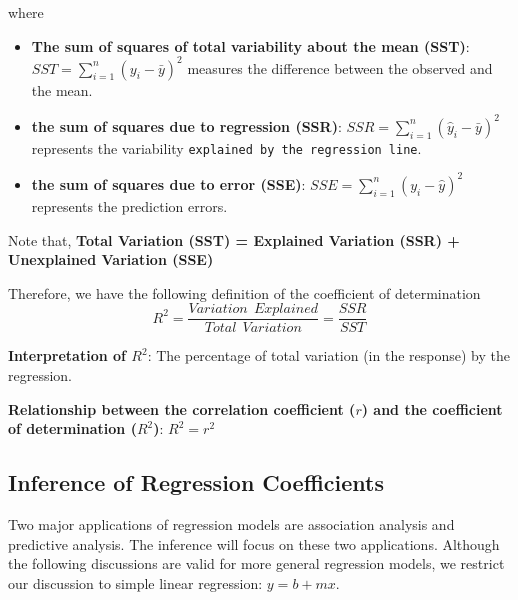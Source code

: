 \documentclass[
]{book}
\providecommand{\tightlist}{%
  \setlength{\itemsep}{0pt}\setlength{\parskip}{0pt}}
\begin{document}
where

\begin{itemize}
\tightlist
\item
  \textbf{The sum of squares of total variability about the mean (SST)}: \(SST = \sum_{i=1}^n(y_i-\bar{y})^2\) measures the difference between the observed and the mean.
\item
  \textbf{the sum of squares due to regression (SSR)}: \(SSR = \sum_{i=1}^n(\hat{y}_i-\bar{y})^2\) represents the variability \texttt{explained\ by\ the\ regression\ line}.
\item
  \textbf{the sum of squares due to error (SSE)}: \(SSE = \sum_{i=1}^n(y_i-\hat{y})^2\) represents the prediction errors.
\end{itemize}

Note that, \textbf{Total Variation (SST) = Explained Variation (SSR) + Unexplained Variation (SSE)}

Therefore, we have the following definition of the coefficient of determination
\[
R^2 = \frac{Variation \ \ Explained}{Total \ \ Variation} = \frac{SSR}{SST}
\]

\textbf{Interpretation of \(R^2\)}: The percentage of total variation (in the response) by the regression.

\textbf{Relationship between the correlation coefficient (\(r\)) and the coefficient of determination (\(R^2\))}: \(R^2 = r^2\)

\hypertarget{inference-of-regression-coefficients}{%
\subsection{Inference of Regression Coefficients}\label{inference-of-regression-coefficients}}

Two major applications of regression models are association analysis and predictive analysis. The inference will focus on these two applications. Although the following discussions are valid for more general regression models, we restrict our discussion to simple linear regression: \(y = b + mx\).
\end{document}
